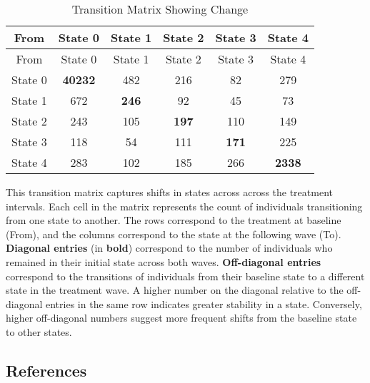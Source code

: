 \documentclass[
  single column]{article}
\begin{document}
\begin{longtable}[]{@{}cccccc@{}}
\caption{Transition Matrix Showing
Change}\label{tbl-transition}\tabularnewline
\toprule\noalign{}
From & State 0 & State 1 & State 2 & State 3 & State 4 \\
\midrule\noalign{}
\endfirsthead
\toprule\noalign{}
From & State 0 & State 1 & State 2 & State 3 & State 4 \\
\midrule\noalign{}
\endhead
\bottomrule\noalign{}
\endlastfoot
State 0 & \textbf{40232} & 482 & 216 & 82 & 279 \\
State 1 & 672 & \textbf{246} & 92 & 45 & 73 \\
State 2 & 243 & 105 & \textbf{197} & 110 & 149 \\
State 3 & 118 & 54 & 111 & \textbf{171} & 225 \\
State 4 & 283 & 102 & 185 & 266 & \textbf{2338} \\
\end{longtable}

This transition matrix captures shifts in states across across the
treatment intervals. Each cell in the matrix represents the count of
individuals transitioning from one state to another. The rows correspond
to the treatment at baseline (From), and the columns correspond to the
state at the following wave (To). \textbf{Diagonal entries} (in
\textbf{bold}) correspond to the number of individuals who remained in
their initial state across both waves. \textbf{Off-diagonal entries}
correspond to the transitions of individuals from their baseline state
to a different state in the treatment wave. A higher number on the
diagonal relative to the off-diagonal entries in the same row indicates
greater stability in a state. Conversely, higher off-diagonal numbers
suggest more frequent shifts from the baseline state to other states.

\newpage{}

\subsection*{References}\label{references}
\end{document}
